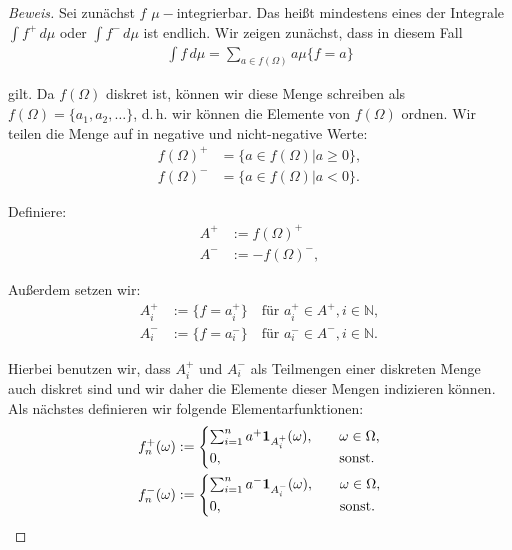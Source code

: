\documentclass[10pt]{article}
\newcommand{\N}{\mathbb{N}}
\begin{document}
\begin{proof}[Beweis]
  Sei zunächst $f$ $\mu-$integrierbar. Das heißt mindestens eines der Integrale 
  $\int f^{+} \,d\mu$ oder $\int f^{-} \,d\mu$ ist endlich.
  Wir zeigen zunächst, dass in diesem Fall
  \begin{align*}
    \int f \,d\mu = \sum_{a\in f(\Omega)} a\mu\{f=a\}
  \end{align*}

  gilt. Da $f(\Omega)$ diskret ist, können wir diese Menge schreiben als 
  $f(\Omega) = \{ a_1,a_2,\dots \}$, d.\,h. wir können die Elemente von $f(\Omega)$  
  ordnen. Wir teilen die Menge auf in negative und nicht-negative Werte:
  \begin{align*}
    f(\Omega)^{+} &= \{ a\in f(\Omega) \vert a\geq 0 \}, \\
    f(\Omega)^{-} &= \{ a\in f(\Omega) \vert a < 0 \}.
  \end{align*}
  
  Definiere:
  \begin{align*}
    A^{+} &:= f(\Omega)^{+} \\
    A^{-} &:= -f(\Omega)^{-},
  \end{align*}

  Außerdem setzen wir:
  \begin{align*}
    A_i^{+} &:= \{ f = a_i^+ \} \quad\text{für $a_i^+\in A^+, i\in\N$}, \\
    A_i^{-} &:= \{ f = a_i^- \} \quad\text{für $a_i^-\in A^-, i\in\N$}.
  \end{align*}

  Hierbei benutzen wir, dass $A_i^{+}$ und $A_i^{-}$ als Teilmengen einer diskreten Menge 
  auch diskret sind und wir daher die Elemente dieser Mengen indizieren können.  
  Als nächstes definieren wir folgende Elementarfunktionen:
  \begin{align*}
      f^{+}_n(\omega) &:= \begin{cases} \sum_{i=1}^{n} a^+ \text{\textbf{1}}_{A^{+}_i}(\omega), &\quad \omega\in\Omega, \\
                                        0                                       , &\quad \text{sonst.}
                         \end{cases}   \\
      f^{-}_n(\omega) &:= \begin{cases} \sum_{i=1}^{n} a^- \text{\textbf{1}}_{A^{-}_i}(\omega), &\quad \omega\in\Omega, \\
                                        0                                       , &\quad \text{sonst.}
                          \end{cases}           
  \end{align*}


\end{proof}
\end{document}
